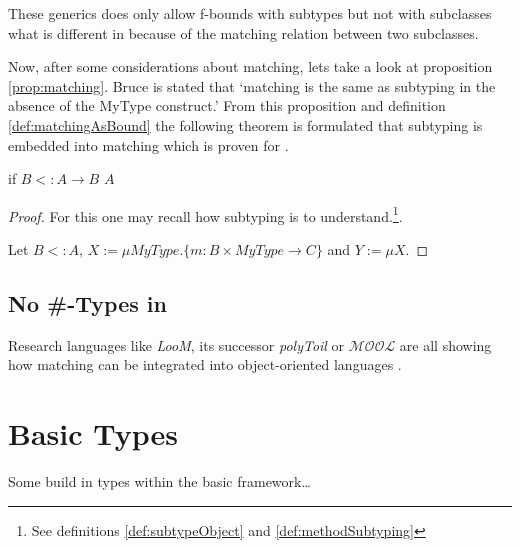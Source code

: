 These generics does only allow f-bounds with subtypes but not with
subclasses what is different in \ooplss because of the matching relation
between two subclasses.

Now, after some considerations about matching, lets take a look at
proposition \ref{prop:matching}. Bruce is stated that `matching is
the same as subtyping in the absence of the MyType construct.' From
this proposition and definition \ref{def:matchingAsBound} the following
theorem is formulated that subtyping is embedded into matching which is
proven for \ooplss.

\begin{thm}
	\label{thm:matchinIsSubtyping}
	if $B <: A \rightarrow B$ \match $A$
\end{thm}

\begin{proof}
	For this one may recall how subtyping is to understand.\footnote{See
	definitions \ref{def:subtypeObject} and \ref{def:methodSubtyping}}.

	Let $B <: A$, $X := \mu MyType.\{m :
	B \times MyType \rightarrow C \} $ and $Y := \mu X.  $

%
\end{proof}


\subsection{No \#-Types in \ooplss}
Research languages like \emph{LooM}, its successor
\emph{polyToil} or $\mathcal{MOOL}$ are all showing how
matching can be integrated into object-oriented languages
\cite{bruce_subtyping_1997,bruce_polytoil:_1995,bruce_foundations_2002}.

\section{Basic Types}
Some build in types within the basic framework\ldots

